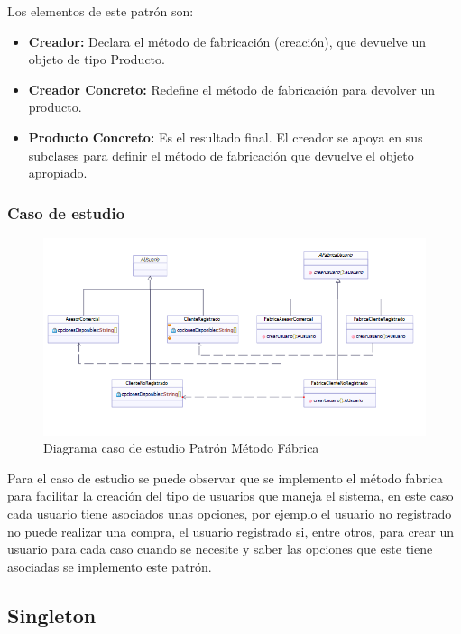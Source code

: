 Los elementos de este patrón son:
\begin{itemize}
	\item \textbf{Creador: }Declara el método de fabricación (creación), que devuelve un objeto de tipo Producto.
	\item \textbf{Creador Concreto: }Redefine el método de fabricación para devolver un producto.
	\item \textbf{Producto Concreto: }Es el resultado final. El creador se apoya en sus subclases para definir el método de fabricación que devuelve el objeto apropiado.
\end{itemize}


\subsubsection{Caso de estudio}
\begin{figure}[h!]
	\centering
	\includegraphics[width=0.7\linewidth]{arquitectura/imagenes/DiagramaMetodoFabrica}
	\caption{Diagrama caso de estudio Patrón Método Fábrica}
\end{figure}

Para el caso de estudio se puede observar que se implemento el método fabrica para facilitar la creación del tipo de usuarios que maneja el sistema, en este caso cada usuario tiene asociados unas opciones, por ejemplo el usuario no registrado no puede realizar una compra, el usuario registrado si, entre otros, para crear un usuario para cada caso cuando se necesite y saber las opciones que este tiene asociadas se implemento este patrón.

\subsection{Singleton}
